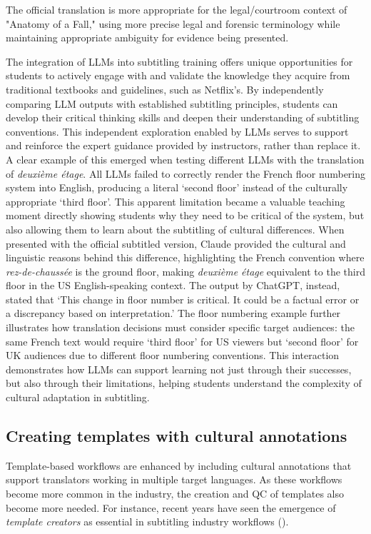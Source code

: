 \documentclass[output=paper]{langscibook}
\begin{document}
 {The official translation is more appropriate for the legal/courtroom context of "Anatomy of a Fall," using more precise legal and forensic terminology while maintaining appropriate ambiguity for evidence being presented.}
\z
\z

The integration of LLMs into subtitling training offers unique opportunities for students to actively engage with and validate the knowledge they acquire from traditional textbooks and guidelines, such as Netflix’s. By independently comparing LLM outputs with established subtitling principles, students can develop their critical thinking skills and deepen their understanding of subtitling conventions. This independent exploration enabled by LLMs serves to support and reinforce the expert guidance provided by instructors, rather than replace it. A clear example of this emerged when testing different LLMs with the translation of \textit{deuxième étage}. All LLMs failed to correctly render the French floor numbering system into English, producing a literal ‘second floor’ instead of the culturally appropriate ‘third floor’. This apparent limitation became a valuable teaching moment directly showing students why they need to be critical of the system, but also allowing them to learn about the subtitling of cultural differences. When presented with the official subtitled version, Claude provided the cultural and linguistic reasons behind this difference, highlighting the French convention where \textit{rez-de-chaussée} is the ground floor, making \textit{deuxième étage} equivalent to the third floor in the US English-speaking context. The output by ChatGPT, instead, stated that ‘This change in floor number is critical. It could be a factual error or a discrepancy based on interpretation.’ The floor numbering example further illustrates how translation decisions must consider specific target audiences: the same French text would require ‘third floor’ for US viewers but ‘second floor’ for UK audiences due to different floor numbering conventions. This interaction demonstrates how LLMs can support learning not just through their successes, but also through their limitations, helping students understand the complexity of cultural adaptation in subtitling.

\subsection{Creating templates with cultural annotations}

Template-based workflows are enhanced by including cultural annotations that support translators working in multiple target languages. As these workflows become more common in the industry, the creation and QC of templates also become more needed. For instance, recent years have seen the emergence of \textit{template creators} as essential in subtitling industry workflows (\citealt{oziemblewska2022quality}).
\end{document}
